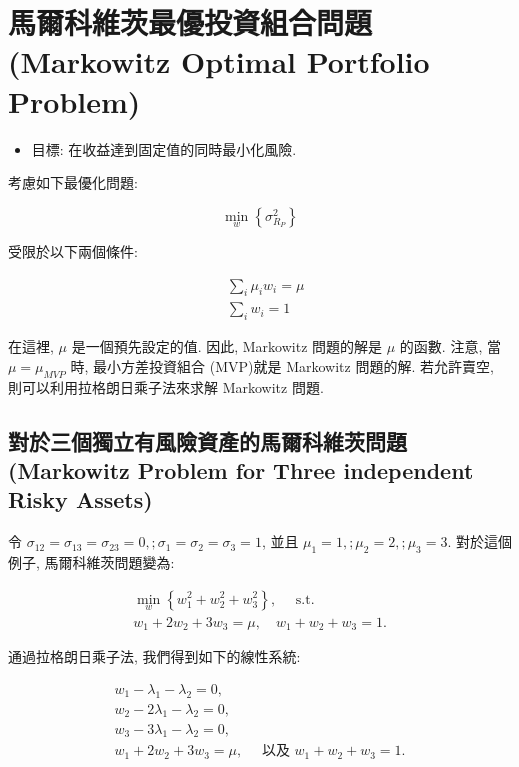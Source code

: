 \documentclass[letterpaper]{article}
\begin{document}
		\section{馬爾科維茨最優投資組合問題 (Markowitz Optimal Portfolio Problem)}
		\begin{itemize}
			\item 目標: 在收益達到固定值的同時最小化風險. 
		\end{itemize}
		
		考慮如下最優化問題: 
		
		$$
		\min _{w}\left\{\sigma_{R_{P}}^{2}\right\}
		$$
		
		受限於以下兩個條件: 
		
		$$
		\begin{aligned}
			& \sum_{i} \mu_{i} w_{i}=\mu \\
			& \sum_{i} w_{i}=1
		\end{aligned}
		$$
		
		在這裡, $\mu$ 是一個預先設定的值. 因此, Markowitz 問題的解是 $\mu$ 的函數. 注意, 當 $\mu = \mu_{MVP}$ 時, 最小方差投資組合 (MVP)就是 Markowitz 問題的解. 若允許賣空, 則可以利用拉格朗日乘子法來求解 Markowitz 問題. 
		
		
		\subsection{對於三個獨立有風險資產的馬爾科維茨問題 (Markowitz Problem for Three independent Risky Assets)}
		令 $\sigma_{12}=\sigma_{13}=\sigma_{23}=0, ;\sigma_{1}=\sigma_{2}=\sigma_{3}=1$, 並且 $\mu_{1}=1, ;\mu_{2}=2, ;\mu_{3}=3$. 對於這個例子, 馬爾科維茨問題變為: 
		
		$$
		\begin{gathered}
			\min _{w}\left\{w_{1}^{2}+w_{2}^{2}+w_{3}^{2}\right\}, \quad \text { s.t. } \\
			w_{1}+2 w_{2}+3 w_{3}=\mu, \quad w_{1}+w_{2}+w_{3}=1 .
		\end{gathered}
		$$
		
		通過拉格朗日乘子法, 我們得到如下的線性系統: 
		
		$$
		\begin{gathered}
			w_{1}-\lambda_{1}-\lambda_{2}=0, \\
			w_{2}-2 \lambda_{1}-\lambda_{2}=0, \\
			w_{3}-3 \lambda_{1}-\lambda_{2}=0, \\
			w_{1}+2 w_{2}+3 w_{3}=\mu, \quad \text { 以及 } w_{1}+w_{2}+w_{3}=1 .
		\end{gathered}
		$$
		
\end{document}

